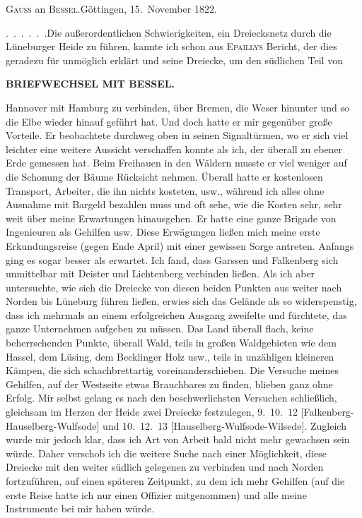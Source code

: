 \begin{center}
\textsc{Gauss} an \textsc{Bessel}.\quad Göttingen, 15.~November 1822.
\end{center}

\begingroup
\makeatletter
\renewcommand{\@makefnmark}{\hbox{\normalfont\textsuperscript{*})}}
\long{}
\makeatother
\par\noindent\hspace*{\parindent}.\ .\ .\ .\ .\ .\quad Die außerordentlichen Schwierigkeiten, ein Dreiecksnetz durch die Lüneburger Heide zu führen, kannte ich schon aus \textsc{Epaillys} Bericht, der dies geradezu für unmöglich erklärt und seine Dreiecke, um den südlichen Teil von
\par\clearpage
{}\hfill{\small\textbf{BRIEFWECHSEL MIT BESSEL.}}\par\medskip
\noindent Hannover mit Hamburg zu verbinden, über Bremen, die Weser hinunter und so die Elbe wieder hinauf geführt hat.
Und doch hatte er mir gegenüber große Vorteile. Er beobachtete durchweg oben in seinen Signaltürmen, wo er sich viel leichter eine weitere Aussicht verschaffen konnte als ich, der überall zu ebener Erde gemessen hat. Beim Freihauen in den Wäldern musste er viel weniger auf die Schonung der Bäume Rücksicht nehmen. Überall hatte er kostenlosen Transport, Arbeiter, die ihn nichts kosteten, usw., während ich alles ohne Ausnahme mit Bargeld bezahlen muss und oft sehe, wie die Kosten sehr, sehr weit über meine Erwartungen hinausgehen. Er hatte eine ganze Brigade von Ingenieuren als Gehilfen usw.
Diese Erwägungen ließen mich meine erste Erkundungsreise (gegen Ende April) mit einer gewissen Sorge antreten.
Anfangs ging es sogar besser als erwartet. Ich fand, dass Garssen und Falkenberg sich unmittelbar mit Deister und Lichtenberg verbinden ließen. Als ich aber untersuchte, wie sich die Dreiecke von diesen beiden Punkten aus weiter nach Norden bis Lüneburg führen ließen, erwies sich das Gelände als so widerspenstig, dass ich mehrmals an einem erfolgreichen Ausgang zweifelte und fürchtete, das ganze Unternehmen aufgeben zu müssen.
Das Land überall flach, keine beherrschenden Punkte, überall Wald, teils in großen Waldgebieten wie dem Hassel, dem Lüsing, dem Becklinger Holz usw., teils in unzähligen kleineren Kämpen, die sich schachbrettartig voreinanderschieben.
Die Versuche meines Gehilfen, auf der Westseite etwas Brauchbares zu finden, blieben ganz ohne Erfolg. Mir selbst gelang es nach den beschwerlichsten Versuchen schließlich, gleichsam im Herzen der Heide zwei Dreiecke festzulegen, 9.~10.~12 [Falkenberg-Hauselberg-Wulfsode] und 10.~12.~13 [Hauselberg-Wulfsode-Wilsede]. Zugleich wurde mir jedoch klar, dass ich  Art von Arbeit bald nicht mehr gewachsen sein würde. Daher verschob ich die weitere Suche nach einer Möglichkeit, diese Dreiecke mit den weiter südlich gelegenen zu verbinden und nach Norden fortzuführen, auf einen späteren Zeitpunkt, zu dem ich mehr Gehilfen (auf die erste Reise hatte ich nur einen Offizier mitgenommen) und alle meine Instrumente bei mir haben würde.
